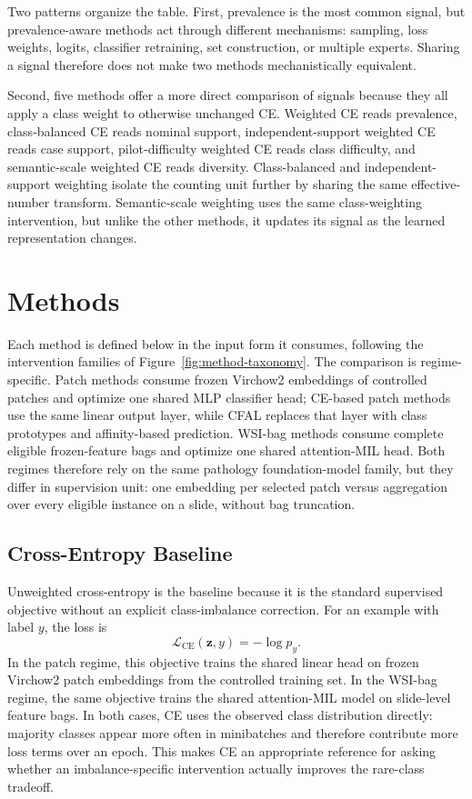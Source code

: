 \documentclass[11pt]{article}
\begin{document}
\noindent Two patterns organize the table. First, prevalence is the most common signal, but prevalence-aware methods act through different mechanisms: sampling, loss weights, logits, classifier retraining, set construction, or multiple experts. Sharing a signal therefore does not make two methods mechanistically equivalent.

Second, five methods offer a more direct comparison of signals because they all apply a class weight to otherwise unchanged CE. Weighted CE reads prevalence, class-balanced CE reads nominal support, independent-support weighted CE reads case support, pilot-difficulty weighted CE reads class difficulty, and semantic-scale weighted CE reads diversity. Class-balanced and independent-support weighting isolate the counting unit further by sharing the same effective-number transform. Semantic-scale weighting uses the same class-weighting intervention, but unlike the other methods, it updates its signal as the learned representation changes.

\section{Methods}
\label{sec:methods}
Each method is defined below in the input form it consumes, following the intervention families of Figure~\ref{fig:method-taxonomy}. The comparison is regime-specific. Patch methods consume frozen Virchow2 embeddings of controlled patches and optimize one shared MLP classifier head; CE-based patch methods use the same linear output layer, while CFAL replaces that layer with class prototypes and affinity-based prediction. WSI-bag methods consume complete eligible frozen-feature bags and optimize one shared attention-MIL head. Both regimes therefore rely on the same pathology foundation-model family, but they differ in supervision unit: one embedding per selected patch versus aggregation over every eligible instance on a slide, without bag truncation.

\subsection{Cross-Entropy Baseline}
Unweighted cross-entropy is the baseline because it is the standard supervised objective without an explicit class-imbalance correction. For an example with label $y$, the loss is
\begin{equation}
  \mathcal{L}_{\mathrm{CE}}(\mathbf{z},y) = -\log p_y.
  \label{eq:ce}
\end{equation}
In the patch regime, this objective trains the shared linear head on frozen Virchow2 patch embeddings from the controlled training set. In the WSI-bag regime, the same objective trains the shared attention-MIL model on slide-level feature bags. In both cases, CE uses the observed class distribution directly: majority classes appear more often in minibatches and therefore contribute more loss terms over an epoch. This makes CE an appropriate reference for asking whether an imbalance-specific intervention actually improves the rare-class tradeoff.
\end{document}

